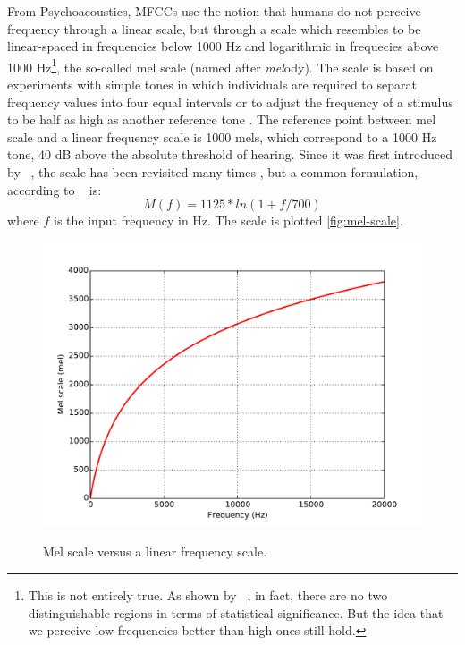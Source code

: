 From Psychoacoustics, \ac{MFCC}s use the notion that humans do not perceive frequency through a linear scale, but through a scale which resembles to be linear-spaced in frequencies below 1000 Hz and logarithmic in frequecies above 1000 Hz\footnote{This is not entirely true. As shown by \citet{Umesh1999}~\cite{Umesh1999}, in fact, there are no two distinguishable regions in terms of statistical significance. But the idea that we perceive low frequencies better than high ones still hold.}, the so-called mel scale (named after \emph{mel}ody). The scale is based on experiments with simple tones in which individuals are required to separat frequency values into four equal intervals or to adjust the frequency of a stimulus to be half as high as another reference tone \cite{Huang2001}. The reference point between mel scale and a linear frequency scale is 1000 mels, which correspond to a 1000 Hz tone, 40 dB above the absolute threshold of hearing. Since it was first introduced by \citet{Stevens1937}~\cite{Stevens1937}, the scale has been revisited many times \cite{Umesh1999}, but a common formulation, according to \citet{Huang2001}~\cite{Huang2001} is:
\begin{equation}
 M(f) = 1125*ln(1 + f / 700)
\end{equation}
where $f$ is the input frequency in Hz. The scale is plotted \autoref{fig:mel-scale}.
\begin{figure}[!ht]
        \myfloatalign
        {\includegraphics[width=1.\linewidth]{gfx/mel-scale.pdf}}
        \caption{Mel scale versus a linear frequency scale.}\label{fig:mel-scale}
\end{figure}

